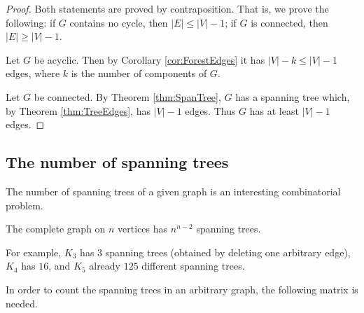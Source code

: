 \begin{page}
\setcounter{section}{2}
\setcounter{subsection}{5}
\setcounter{dfn}{12}
\label{portion:287}

\begin{proof}
Both statements are proved by contraposition.
That is, we prove the following: if $G$ contains no cycle, then $|E| \le |V| - 1$; if $G$ is connected, then $|E| \ge |V| - 1$.

Let $G$ be acyclic.
Then by Corollary \ref{cor:ForestEdges} it has $|V| - k \le |V| - 1$ edges, where $k$ is the number of components of $G$.

Let $G$ be connected.
By Theorem \ref{thm:SpanTree}, $G$ has a spanning tree which, by Theorem \ref{thm:TreeEdges}, has $|V| - 1$ edges.
Thus $G$ has at least $|V| - 1$ edges.
\end{proof}





\end{page}

\begin{page}
\setcounter{section}{2}
\setcounter{subsection}{5}
\setcounter{dfn}{12}
\label{portion:289}

\subsection{The number of spanning trees}
The number of spanning trees of a given graph is an interesting combinatorial problem.


\end{page}

\begin{page}
\setcounter{section}{2}
\setcounter{subsection}{5}
\setcounter{dfn}{13}
\label{portion:291}

\begin{thm}
The complete graph on $n$ vertices has $n^{n-2}$ spanning trees.
\end{thm}

\end{page}

\begin{page}
\setcounter{section}{2}
\setcounter{subsection}{5}
\setcounter{dfn}{13}
\label{portion:292}

For example, $K_3$ has $3$ spanning trees (obtained by deleting one arbitrary edge),
$K_4$ has $16$, and $K_5$ already $125$ different spanning trees.

In order to count the spanning trees in an arbitrary graph, the following matrix is needed.

\end{page}

